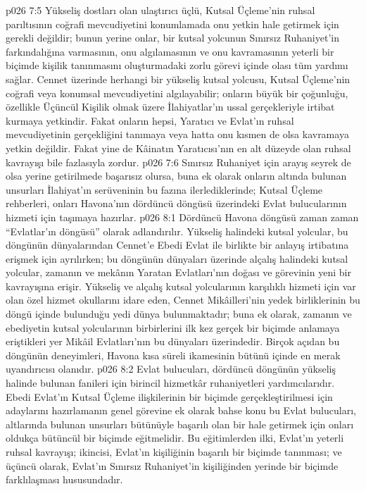 \vs p026 7:5 Yükseliş dostları olan ulaştırıcı üçlü, Kutsal Üçleme’nin ruhsal parıltısının coğrafi mevcudiyetini konumlamada onu yetkin hale getirmek için gerekli değildir; bunun yerine onlar, bir kutsal yolcunun Sınırsız Ruhaniyet’in farkındalığına varmasının, onu algılamasının ve onu kavramasının yeterli bir biçimde kişilik tanınmasını oluşturmadaki zorlu görevi içinde olası tüm yardımı sağlar. Cennet üzerinde herhangi bir yükseliş kutsal yolcusu, Kutsal Üçleme’nin coğrafi veya konumsal mevcudiyetini algılayabilir; onların büyük bir çoğunluğu, özellikle Üçüncül Kişilik olmak üzere İlahiyatlar’ın ussal gerçekleriyle irtibat kurmaya yetkindir. Fakat onların hepsi, Yaratıcı ve Evlat’ın ruhsal mevcudiyetinin gerçekliğini tanımaya veya hatta onu kısmen de olsa kavramaya yetkin değildir. Fakat yine de Kâinatın Yaratıcısı’nın en alt düzeyde olan ruhsal kavrayışı bile fazlasıyla zordur.
\vs p026 7:6 Sınırsız Ruhaniyet için arayış seyrek de olsa yerine getirilmede başarısız olursa, buna ek olarak onların altında bulunan unsurları İlahiyat’ın serüveninin bu fazına ilerlediklerinde; Kutsal Üçleme rehberleri, onları Havona’nın dördüncü döngüsü üzerindeki Evlat bulucularının hizmeti için taşımaya hazırlar.
\vs p026 8:1 Dördüncü Havona döngüsü zaman zaman “Evlatlar’ın döngüsü” olarak adlandırılır. Yükseliş halindeki kutsal yolcular, bu döngünün dünyalarından Cennet’e Ebedi Evlat ile birlikte bir anlayış irtibatına erişmek için ayrılırken; bu döngünün dünyaları üzerinde alçalış halindeki kutsal yolcular, zamanın ve mekânın Yaratan Evlatları’nın doğası ve görevinin yeni bir kavrayışına erişir. Yükseliş ve alçalış kutsal yolcularının karşılıklı hizmeti için var olan özel hizmet okullarını idare eden, Cennet Mikâilleri’nin yedek birliklerinin bu döngü içinde bulunduğu yedi dünya bulunmaktadır; buna ek olarak, zamanın ve ebediyetin kutsal yolcularının birbirlerini ilk kez gerçek bir biçimde anlamaya eriştikleri yer Mikâil Evlatları’nın bu dünyaları üzerindedir. Birçok açıdan bu döngünün deneyimleri, Havona kısa süreli ikamesinin bütünü içinde en merak uyandırıcısı olanıdır.
\vs p026 8:2 Evlat bulucuları, dördüncü döngünün yükseliş halinde bulunan fanileri için birincil hizmetkâr ruhaniyetleri yardımcılarıdır. Ebedi Evlat’ın Kutsal Üçleme ilişkilerinin bir biçimde gerçekleştirilmesi için adaylarını hazırlamanın genel görevine ek olarak bahse konu bu Evlat bulucuları, altlarında bulunan unsurları bütünüyle başarılı olan bir hale getirmek için onları oldukça bütüncül bir biçimde eğitmelidir. Bu eğitimlerden ilki, Evlat’ın yeterli ruhsal kavrayışı; ikincisi, Evlat’ın kişiliğinin başarılı bir biçimde tanınması; ve üçüncü olarak, Evlat’ın Sınırsız Ruhaniyet’in kişiliğinden yerinde bir biçimde farklılaşması hususundadır.
